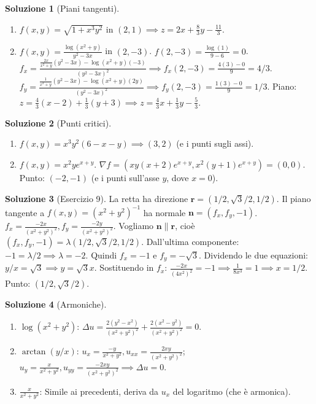 \documentclass[12pt,a4paper]{article}
\theoremstyle{definition}
\newtheorem{sol}{Soluzione}
\begin{document}
\begin{sol}[Piani tangenti]
    \begin{enumerate}
        \item $f(x,y) = \sqrt{1+x^3y^2}$ in $(2,1) \implies z = 2x + \frac{8}{3}y - \frac{11}{3}$.
        \item $f(x,y) = \frac{\log(x^2+y)}{y^2-3x}$ in $(2,-3)$. $f(2,-3) = \frac{\log(1)}{9-6} = 0$.
              $f_x = \frac{\frac{2x}{x^2+y}(y^2-3x) - \log(x^2+y)(-3)}{(y^2-3x)^2} \implies f_x(2,-3) = \frac{4(3)-0}{9} = 4/3$.
              $f_y = \frac{\frac{1}{x^2+y}(y^2-3x) - \log(x^2+y)(2y)}{(y^2-3x)^2} \implies f_y(2,-3) = \frac{1(3)-0}{9} = 1/3$.
              Piano: $z = \frac{4}{3}(x-2) + \frac{1}{3}(y+3) \implies z = \frac{4}{3}x + \frac{1}{3}y - \frac{5}{3}$.
    \end{enumerate}
\end{sol}

\begin{sol}[Punti critici]
    \begin{enumerate}
        \item $f(x,y) = x^3 y^2 (6 - x - y) \implies (3,2)$ (e i punti sugli assi).
        \item $f(x,y) = x^2 y e^{x+y}$. $\nabla f = (xy(x+2)e^{x+y}, x^2(y+1)e^{x+y}) = (0,0)$.
              Punto: $(-2, -1)$ (e i punti sull'asse $y$, dove $x=0$).
    \end{enumerate}
\end{sol}

\begin{sol}[Esercizio 9]
    La retta ha direzione $\mathbf{r} = (1/2, \sqrt{3}/2, 1/2)$. Il piano tangente a $f(x,y) = (x^2+y^2)^{-1}$ ha normale $\mathbf{n} = (f_x, f_y, -1)$.
    $f_x = \frac{-2x}{(x^2+y^2)^2}, f_y = \frac{-2y}{(x^2+y^2)^2}$.
    Vogliamo $\mathbf{n} \parallel \mathbf{r}$, cioè $(f_x, f_y, -1) = \lambda (1/2, \sqrt{3}/2, 1/2)$.
    Dall'ultima componente: $-1 = \lambda/2 \implies \lambda = -2$.
    Quindi $f_x = -1$ e $f_y = -\sqrt{3}$. Dividendo le due equazioni: $y/x = \sqrt{3} \implies y = \sqrt{3}x$.
    Sostituendo in $f_x$: $\frac{-2x}{(4x^2)^2} = -1 \implies \frac{1}{8x^3} = 1 \implies x = 1/2$.
    Punto: $(1/2, \sqrt{3}/2)$.
\end{sol}

\begin{sol}[Armoniche]
    \begin{enumerate}
        \item $\log(x^2+y^2)$: $\Delta u = \frac{2(y^2-x^2)}{(x^2+y^2)^2} + \frac{2(x^2-y^2)}{(x^2+y^2)^2} = 0$.
        \item $\arctan(y/x)$: $u_x = \frac{-y}{x^2+y^2}, u_{xx} = \frac{2xy}{(x^2+y^2)^2}$; $u_y = \frac{x}{x^2+y^2}, u_{yy} = \frac{-2xy}{(x^2+y^2)^2} \implies \Delta u = 0$.
        \item $\frac{x}{x^2+y^2}$: Simile ai precedenti, deriva da $u_x$ del logaritmo (che è armonica).
    \end{enumerate}
\end{sol}
\end{document}
